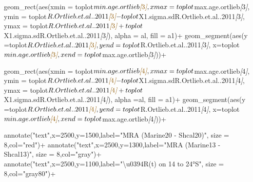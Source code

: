 \documentclass[
]{article}
\newenvironment{Shaded}{\begin{snugshade}}{\end{snugshade}}
\newcommand{\CommentTok}[1]{\textcolor[rgb]{0.56,0.35,0.01}{\textit{#1}}}
\newcommand{\NormalTok}[1]{#1}
\newcommand{\OtherTok}[1]{\textcolor[rgb]{0.56,0.35,0.01}{#1}}
\begin{document}
\begin{Shaded}
\begin{Highlighting}[]
\NormalTok{  geom\_rect(aes(xmin = toplot$min.age.ortlieb}\CommentTok{[}\OtherTok{3}\CommentTok{]}\NormalTok{, }
\NormalTok{                xmax = toplot$max.age.ortlieb}\CommentTok{[}\OtherTok{3}\CommentTok{]}\NormalTok{, }
\NormalTok{                ymin = toplot$R.Ortlieb.et.al..2011}\CommentTok{[}\OtherTok{3}\CommentTok{]}\NormalTok{{-}toplot$X1.sigma.sdR.Ortlieb.et.al..2011}\CommentTok{[}\OtherTok{3}\CommentTok{]}\NormalTok{,}
\NormalTok{                ymax = toplot$R.Ortlieb.et.al..2011}\CommentTok{[}\OtherTok{3}\CommentTok{]}\NormalTok{+toplot$X1.sigma.sdR.Ortlieb.et.al..2011}\CommentTok{[}\OtherTok{3}\CommentTok{]}\NormalTok{),}
\NormalTok{            alpha = al,}
\NormalTok{            fill = a1)+}
\NormalTok{  geom\_segment(aes(y =toplot$R.Ortlieb.et.al..2011}\CommentTok{[}\OtherTok{3}\CommentTok{]}\NormalTok{,}
\NormalTok{                   yend =toplot$R.Ortlieb.et.al..2011}\CommentTok{[}\OtherTok{3}\CommentTok{]}\NormalTok{,}
\NormalTok{                   x=toplot$min.age.ortlieb}\CommentTok{[}\OtherTok{3}\CommentTok{]}\NormalTok{,}
\NormalTok{                   xend=toplot$max.age.ortlieb}\CommentTok{[}\OtherTok{3}\CommentTok{]}\NormalTok{))+}
  
\NormalTok{  geom\_rect(aes(xmin = toplot$min.age.ortlieb}\CommentTok{[}\OtherTok{4}\CommentTok{]}\NormalTok{, }
\NormalTok{                xmax = toplot$max.age.ortlieb}\CommentTok{[}\OtherTok{4}\CommentTok{]}\NormalTok{, }
\NormalTok{                ymin = toplot$R.Ortlieb.et.al..2011}\CommentTok{[}\OtherTok{4}\CommentTok{]}\NormalTok{{-}toplot$X1.sigma.sdR.Ortlieb.et.al..2011}\CommentTok{[}\OtherTok{4}\CommentTok{]}\NormalTok{,}
\NormalTok{                ymax = toplot$R.Ortlieb.et.al..2011}\CommentTok{[}\OtherTok{4}\CommentTok{]}\NormalTok{+toplot$X1.sigma.sdR.Ortlieb.et.al..2011}\CommentTok{[}\OtherTok{4}\CommentTok{]}\NormalTok{),}
\NormalTok{            alpha =al,}
\NormalTok{            fill = a1)+}
\NormalTok{  geom\_segment(aes(y =toplot$R.Ortlieb.et.al..2011}\CommentTok{[}\OtherTok{4}\CommentTok{]}\NormalTok{,}
\NormalTok{                   yend=toplot$R.Ortlieb.et.al..2011}\CommentTok{[}\OtherTok{4}\CommentTok{]}\NormalTok{,}
\NormalTok{                   x=toplot$min.age.ortlieb}\CommentTok{[}\OtherTok{4}\CommentTok{]}\NormalTok{,}
\NormalTok{                   xend=toplot$max.age.ortlieb}\CommentTok{[}\OtherTok{4}\CommentTok{]}\NormalTok{))+}
  
\NormalTok{  annotate("text",x=2500,y=1500,label="MRA (Marine20 {-} Shcal20)", size = 8,col="red")+}
\NormalTok{  annotate("text",x=2500,y=1300,label="MRA (Marine13 {-} Shcal13)", size = 8,col="gray")+}
\NormalTok{  annotate("text",x=2500,y=1100,label="\textbackslash{}u0394R(t) on 14 to 24°S", size = 8,col="gray80")+}


\end{Highlighting}
\end{Shaded}
\end{document}

